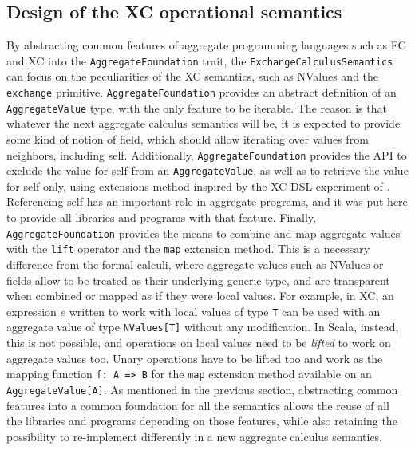 \subsection{Design of the XC operational semantics} \label{chap:design->sec:final-dsl->subsec:exchange-calculus-semantics-design}

By abstracting common features of aggregate programming languages such as \ac{FC} and \ac{XC} into the \texttt{AggregateFoundation} trait, the \texttt{ExchangeCalculusSemantics} can focus on the peculiarities of the \ac{XC} semantics, such as NValues and the \texttt{exchange} primitive.
%
\texttt{AggregateFoundation} provides an abstract definition of an \texttt{AggregateValue} type, with the only feature to be iterable.
%
The reason is that whatever the next aggregate calculus semantics will be, it is expected to provide some kind of notion of field, which should allow iterating over values from neighbors, including self.
%
Additionally, \texttt{AggregateFoundation} provides the \ac{API} to exclude the value for self from an \texttt{AggregateValue}, as well as to retrieve the value for self only, using extensions method inspired by the \ac{XC} \ac{DSL} experiment of .
%
Referencing self has an important role in aggregate programs, and it was put here to provide all libraries and programs with that feature.
%
Finally, \texttt{AggregateFoundation} provides the means to combine and map aggregate values with the \texttt{lift} operator and the \texttt{map} extension method.
%
This is a necessary difference from the formal calculi, where aggregate values such as NValues or fields allow to be treated as their underlying generic type, and are transparent when combined or mapped as if they were local values.
%
For example, in \ac{XC}, an expression $e$ written to work with local values of type \texttt{T} can be used with an aggregate value of type \texttt{NValues[T]} without any modification.
%
In Scala, instead, this is not possible, and operations on local values need to be \textit{lifted} to work on aggregate values too.
%
Unary operations have to be lifted too and work as the mapping function \texttt{f: A => B} for the \texttt{map} extension method available on an \texttt{AggregateValue[A]}.
%
As mentioned in the previous section, abstracting common features into a common foundation for all the semantics allows the reuse of all the libraries and programs depending on those features, while also retaining the possibility to re-implement differently in a new aggregate calculus semantics.

